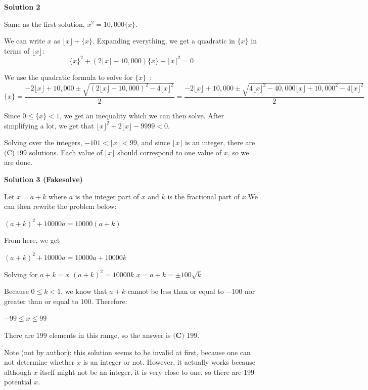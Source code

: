 \begin{enumerate}
 



\textbf{Solution 2}

Same as the first solution, $x^2=10,000\{x\}$.

 
We can write $x$ as $\lfloor x \rfloor+\{x\}$. Expanding everything, we get a quadratic in $\{x\}$ in terms of $\lfloor x \rfloor$:
 \[\{x\}^2+ (2\lfloor x \rfloor -10,000)\{x\} + \lfloor x \rfloor ^2 = 0\]

 
We use the quadratic formula to solve for $\{x\}$ :
 \[\{x\} = \frac {-2\lfloor x \rfloor + 10,000 \pm \sqrt{ ( 2\lfloor x \rfloor - 10,000 )^2 - 4\lfloor x \rfloor^2  }}{2} = \frac {-2\lfloor x \rfloor + 10,000 \pm \sqrt{ 4\lfloor x \rfloor^2 -40,000 \lfloor x \rfloor + 10,000^2- 4\lfloor x \rfloor^2  }}{2}\]

 
Since $0 \leq \{x\} < 1$, we get an inequality which we can then solve. After simplifying a lot, we get that $\lfloor x \rfloor^2 + 2\lfloor x \rfloor - 9999 < 0$.

 
Solving over the integers, $-101 < \lfloor x \rfloor < 99$, and since $\lfloor x \rfloor$ is an integer, there are $\boxed{\text{(C)}~199}$ solutions. Each value of $\lfloor x \rfloor$ should correspond to one value of $x$, so we are done.

 



\textbf{Solution 3 (Fakesolve)}

Let $x = a+k$ where $a$ is the integer part of $x$ and $k$ is the fractional part of $x$.We can then rewrite the problem below:

 $(a+k)^2 + 10000a = 10000(a+k)$

 From here, we get

 $(a+k)^2 + 10000a = 10000a + 10000k$

 Solving for $a+k = x$
$(a+k)^2 = 10000k$
$x = a+k = \pm100\sqrt{k}$

 Because $0 \leq k < 1$, we know that $a+k$ cannot be less than or equal to $-100$ nor greater than or equal to $100$. Therefore:

 $-99 \leq x \leq 99$

 There are $199$ elements in this range, so the answer is $\boxed{\textbf{(C)} \text{ 199}}$.

 
Note (not by author): this solution seems to be invalid at first, because one can not determine whether $x$ is an integer or not. However, it actually works because although $x$ itself might not be an integer, it is very close to one, so there are 199 potential $x$.


\end{enumerate}
